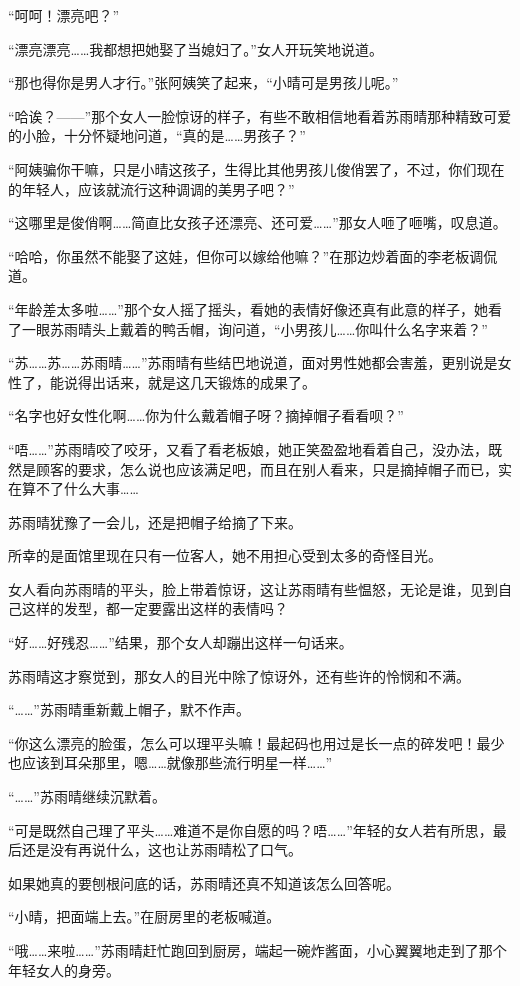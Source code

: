 “呵呵！漂亮吧？”

“漂亮漂亮……我都想把她娶了当媳妇了。”女人开玩笑地说道。

“那也得你是男人才行。”张阿姨笑了起来，“小晴可是男孩儿呢。”

“哈诶？——”那个女人一脸惊讶的样子，有些不敢相信地看着苏雨晴那种精致可爱的小脸，十分怀疑地问道，“真的是……男孩子？”

“阿姨骗你干嘛，只是小晴这孩子，生得比其他男孩儿俊俏罢了，不过，你们现在的年轻人，应该就流行这种调调的美男子吧？”

“这哪里是俊俏啊……简直比女孩子还漂亮、还可爱……”那女人咂了咂嘴，叹息道。

“哈哈，你虽然不能娶了这娃，但你可以嫁给他嘛？”在那边炒着面的李老板调侃道。

“年龄差太多啦……”那个女人摇了摇头，看她的表情好像还真有此意的样子，她看了一眼苏雨晴头上戴着的鸭舌帽，询问道，“小男孩儿……你叫什么名字来着？”

“苏……苏……苏雨晴……”苏雨晴有些结巴地说道，面对男性她都会害羞，更别说是女性了，能说得出话来，就是这几天锻炼的成果了。

“名字也好女性化啊……你为什么戴着帽子呀？摘掉帽子看看呗？”

“唔……”苏雨晴咬了咬牙，又看了看老板娘，她正笑盈盈地看着自己，没办法，既然是顾客的要求，怎么说也应该满足吧，而且在别人看来，只是摘掉帽子而已，实在算不了什么大事……

苏雨晴犹豫了一会儿，还是把帽子给摘了下来。

所幸的是面馆里现在只有一位客人，她不用担心受到太多的奇怪目光。

女人看向苏雨晴的平头，脸上带着惊讶，这让苏雨晴有些愠怒，无论是谁，见到自己这样的发型，都一定要露出这样的表情吗？

“好……好残忍……”结果，那个女人却蹦出这样一句话来。

苏雨晴这才察觉到，那女人的目光中除了惊讶外，还有些许的怜悯和不满。

“……”苏雨晴重新戴上帽子，默不作声。

“你这么漂亮的脸蛋，怎么可以理平头嘛！最起码也用过是长一点的碎发吧！最少也应该到耳朵那里，嗯……就像那些流行明星一样……”

“……”苏雨晴继续沉默着。

“可是既然自己理了平头……难道不是你自愿的吗？唔……”年轻的女人若有所思，最后还是没有再说什么，这也让苏雨晴松了口气。

如果她真的要刨根问底的话，苏雨晴还真不知道该怎么回答呢。

“小晴，把面端上去。”在厨房里的老板喊道。

“哦……来啦……”苏雨晴赶忙跑回到厨房，端起一碗炸酱面，小心翼翼地走到了那个年轻女人的身旁。

